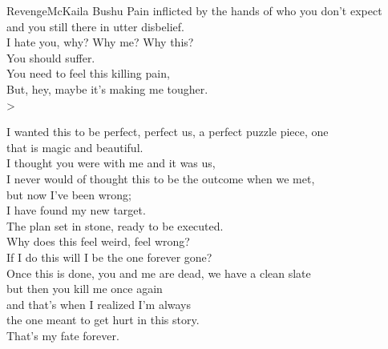 \begin{poetry}{Revenge}{McKaila Bushu}
Pain inflicted by the hands of who you don't expect\\
and you still there in utter disbelief.\\
I hate you, why? Why me? Why this?\\
You should suffer.\\
You need to feel this killing pain,\\
But, hey, maybe it's making me tougher.\\>

I wanted this to be perfect, perfect us, a perfect puzzle piece, one\\
that is magic and beautiful.\\
I thought you were with me and it was us,\\
I never would of thought this to be the outcome when we met,\\
but now I've been wrong;\\
I have found my new target.\\

The plan set in stone, ready to be executed.\\
Why does this feel weird, feel wrong?\\
If I do this will I be the one forever gone?\\
Once this is done, you and me are dead, we have a clean slate\\
but then you kill me once again\\
and that's when I realized I'm always\\
the one meant to get hurt in this story.\\
That's my fate forever.
\end{poetry}

